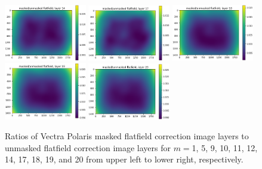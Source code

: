 \documentclass[letterpaper,11pt]{article}
\begin{document}
\begin{figure}[!ht]
\includegraphics[width=0.32\textwidth]{images/results/masked_over_unmasked_flatfield_image_layers_polaris/masked_over_unmasked_flatfield_layer_14}
\includegraphics[width=0.32\textwidth]{images/results/masked_over_unmasked_flatfield_image_layers_polaris/masked_over_unmasked_flatfield_layer_17}
\includegraphics[width=0.32\textwidth]{images/results/masked_over_unmasked_flatfield_image_layers_polaris/masked_over_unmasked_flatfield_layer_18}
\includegraphics[width=0.32\textwidth]{images/results/masked_over_unmasked_flatfield_image_layers_polaris/masked_over_unmasked_flatfield_layer_19}
\includegraphics[width=0.32\textwidth]{images/results/masked_over_unmasked_flatfield_image_layers_polaris/masked_over_unmasked_flatfield_layer_20}
\caption{\footnotesize Ratios of Vectra Polaris masked flatfield correction image layers to unmasked flatfield correction image layers for $m=$1, 5, 9, 10, 11, 12, 14, 17, 18, 19, and 20 from upper left to lower right, respectively.}
\label{fig:masked_over_unmasked_flatfield_image_layers_polaris_1}
\end{figure}
\end{document}
